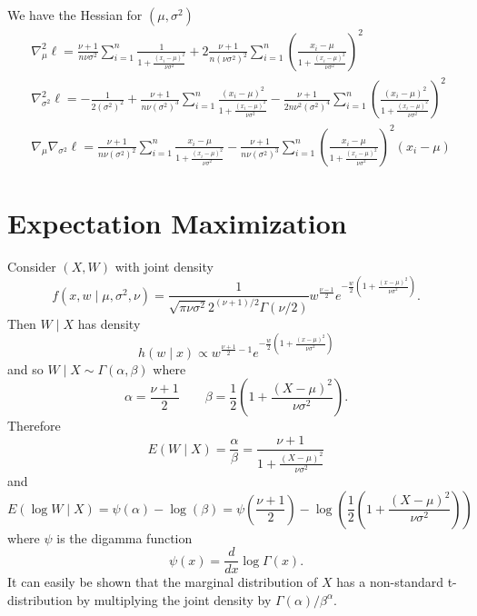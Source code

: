 \documentclass[a4paper,12pt]{article}
\begin{document}
We have the Hessian for $(\mu,\sigma^2)$
\begin{align*}
    &\nabla^{2}_{\mu}\ell = \frac{\nu + 1}{n\nu\sigma^2}\sum_{i=1}^{n}\frac{1}{1+\frac{(x_{i}-\mu)^2}{\nu\sigma^2}}+2\frac{\nu + 1}{n(\nu\sigma^2)^2}\sum_{i=1}^{n}\left(\frac{x_{i}-\mu}{1 + \frac{(x_{i}-\mu)^2}{\nu\sigma^2}}\right)^2\\
    &\nabla_{\sigma^2}^{2}\ell = -\frac{1}{2(\sigma^2)^2}+\frac{\nu + 1}{n\nu(\sigma^2)^3}\sum_{i=1}^{n}\frac{(x_{i}-\mu)^2}{1 + \frac{(x_{i}-\mu)^2}{\nu\sigma^2}}-\frac{\nu + 1}{2n\nu^2(\sigma^2)^4}\sum_{i=1}^{n}\left(\frac{(x_{i}-\mu)^2}{1 + \frac{(x_{i}-\mu)^2}{\nu\sigma^2}}\right)^2\\
    &\nabla_{\mu}\nabla_{\sigma^2}\ell = \frac{\nu + 1}{n\nu(\sigma^2)^2}\sum_{i=1}^{n}\frac{x_{i} - \mu}{1 + \frac{(x_{i} - \mu)^2}{\nu\sigma^2}}-\frac{\nu + 1}{n\nu(\sigma^2)^3}\sum_{i=1}^{n}\left(\frac{x_{i}-\mu}{1 + \frac{(x_{i}-\mu)^2}{\nu\sigma^2}}\right)^{2}(x_{i}-\mu)
\end{align*}
\section{Expectation Maximization}
Consider $(X, W)$ with joint density
\begin{equation}
    \label{eq:join}
    f(x,w\mid \mu,\sigma^2,\nu)=\frac{1}{\sqrt{\pi\nu\sigma^2}2^{(\nu+1)/2}\Gamma(\nu/2)}w^{\frac{\nu - 1}{2}}e^{-\frac{w}{2}\left(1+\frac{(x -\mu)^2}{\nu\sigma^2}\right)}.
\end{equation}
Then $W\mid X$ has density
\begin{equation}
    h(w\mid x)\propto w^{\frac{\nu + 1}{2} - 1}e^{-\frac{w}{2}\left(1+\frac{(x -\mu)^2}{\nu\sigma^2}\right)}
\end{equation}
and so $W\mid X \sim \Gamma(\alpha, \beta)$ where
\begin{equation}
    \alpha = \frac{\nu + 1}{2} \quad\quad 
    \beta = \frac{1}{2}\left(1+\frac{(X -\mu)^2}{\nu\sigma^2}\right).
\end{equation}
Therefore
\begin{equation}
    E(W\mid X) = \frac{\alpha}{\beta} = \frac{\nu + 1}{1+\frac{(X -\mu)^2}{\nu\sigma^2}}
\end{equation}
and
\begin{equation}
    E(\log W \mid X)=\psi(\alpha)-\log(\beta)=\psi\left(\frac{\nu + 1}{2}\right)-\log\left(\frac{1}{2}\left(1+\frac{(X - \mu)^2}{\nu\sigma^2}\right)\right)
\end{equation}
where $\psi$ is the digamma function
\begin{equation}
    \psi(x) = \frac{d}{dx}\log\Gamma(x).
\end{equation}
It can easily be shown that the marginal distribution of $X$ has a non-standard t-distribution by multiplying the joint density by $\Gamma(\alpha)/\beta^{\alpha}$.
\end{document}
